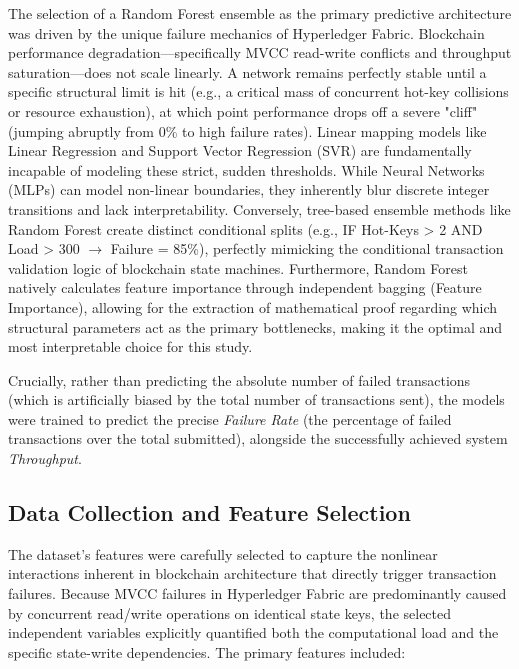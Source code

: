 \documentclass[12pt]{article}
\begin{document}
The selection of a Random Forest ensemble as the primary predictive architecture was driven by the unique failure mechanics of Hyperledger Fabric. Blockchain performance degradation---specifically MVCC read-write conflicts and throughput saturation---does not scale linearly. A network remains perfectly stable until a specific structural limit is hit (e.g., a critical mass of concurrent hot-key collisions or resource exhaustion), at which point performance drops off a severe "cliff" (jumping abruptly from 0\% to high failure rates). Linear mapping models like Linear Regression and Support Vector Regression (SVR) are fundamentally incapable of modeling these strict, sudden thresholds. While Neural Networks (MLPs) can model non-linear boundaries, they inherently blur discrete integer transitions and lack interpretability. Conversely, tree-based ensemble methods like Random Forest create distinct conditional splits (e.g., IF Hot-Keys > 2 AND Load > 300 $\rightarrow$ Failure = 85\%), perfectly mimicking the conditional transaction validation logic of blockchain state machines. Furthermore, Random Forest natively calculates feature importance through independent bagging (Feature Importance), allowing for the extraction of mathematical proof regarding which structural parameters act as the primary bottlenecks, making it the optimal and most interpretable choice for this study.

Crucially, rather than predicting the absolute number of failed transactions (which is artificially biased by the total number of transactions sent), the models were trained to predict the precise \textit{Failure Rate} (the percentage of failed transactions over the total submitted), alongside the successfully achieved system \textit{Throughput}.

\subsection{Data Collection and Feature Selection}
The dataset's features were carefully selected to capture the nonlinear interactions inherent in blockchain architecture that directly trigger transaction failures. Because MVCC failures in Hyperledger Fabric are predominantly caused by concurrent read/write operations on identical state keys, the selected independent variables explicitly quantified both the computational load and the specific state-write dependencies. The primary features included:
\end{document}
